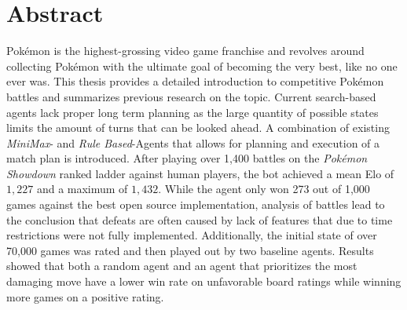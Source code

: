 \chapter*{Abstract}
Pokémon is the highest-grossing video game franchise and revolves around collecting Pokémon with the 
ultimate goal of becoming \grqq the very best, like no one ever was\grqq. This thesis provides a detailed
introduction to competitive Pokémon battles and summarizes previous research on the topic. Current
search-based agents lack proper long term planning as the large quantity of possible states limits
the amount of turns that can be looked ahead. A combination of existing \textit{MiniMax}-
and \textit{Rule Based}-Agents that allows for planning and execution of a match plan is introduced.
After playing over 1,400 battles on the \textit{Pokémon Showdown} ranked ladder against human players,
the bot achieved a mean Elo of $1,227$ and a maximum of $1,432$. While the agent only won 273 out of 
1,000 games against the best open source implementation, analysis of battles lead to the conclusion that defeats
are often caused by lack of features that due to time restrictions were not fully implemented. 
Additionally, the initial state of over 70,000 games was rated and then played out by two baseline 
agents. Results showed that both a random agent and an agent that prioritizes the most damaging
move have a lower win rate on unfavorable board ratings while winning more games on a positive rating. 
